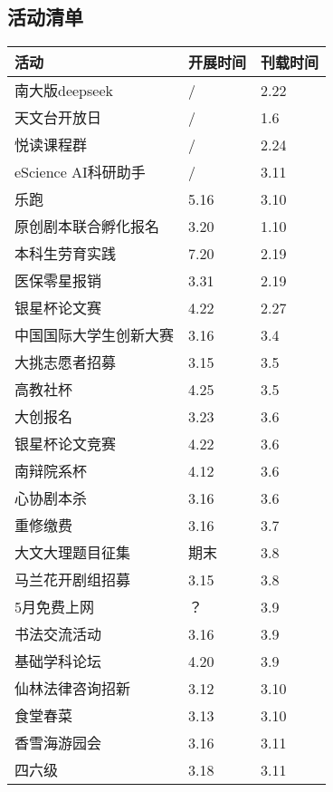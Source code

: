 \documentclass[letterpaper, 12pt]{article}
\begin{document}
\begin{multicols}{2}

\section{活动清单}
\begin{tabular}{|>{\centering\arraybackslash}m{}|m{}|m{}|}
    \hline
    活动 & 开展时间 & 刊载时间\\
    \hline\hline
    南大版deepseek & / & 2.22\\
    天文台开放日 & / & 1.6\\
    悦读课程群 & / & 2.24\\
    eScience AI科研助手 & / & 3.11\\
    乐跑 & 5.16 & 3.10\\
    原创剧本联合孵化报名 & 3.20 & 1.10\\
    本科生劳育实践 & 7.20 & 2.19\\
    医保零星报销 & 3.31 & 2.19\\
    银星杯论文赛 & 4.22 & 2.27\\
    中国国际大学生创新大赛 & 3.16 & 3.4\\
    大挑志愿者招募 & 3.15 & 3.5\\
    高教社杯 & 4.25 & 3.5\\
    大创报名 & 3.23 & 3.6\\
    银星杯论文竞赛 & 4.22 & 3.6\\
    南辩院系杯 & 4.12 & 3.6\\
    心协剧本杀 & 3.16 & 3.6\\
    重修缴费 & 3.16 & 3.7\\
    大文大理题目征集 & 期末 & 3.8\\
    马兰花开剧组招募 & 3.15 & 3.8\\
    5月免费上网 & ？ & 3.9\\
    书法交流活动 & 3.16 & 3.9\\
    基础学科论坛 & 4.20 & 3.9\\
    仙林法律咨询招新 & 3.12 & 3.10\\
    食堂春菜 & 3.13 & 3.10\\
    香雪海游园会 & 3.16 & 3.11\\
    四六级 & 3.18 & 3.11\\
    \hline
\end{tabular}



\end{multicols}
\end{document}
